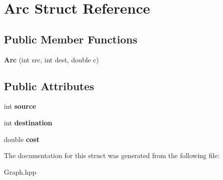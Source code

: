 \hypertarget{structArc}{}\section{Arc Struct Reference}
\label{structArc}
\subsection*{Public Member Functions}
\begin{DoxyCompactItemize}
\item 
{\bfseries Arc} (int src, int dest, double c)\hypertarget{structArc_acdc6a841b8f5ec1ca5661b620bd9c696}{}\label{structArc_acdc6a841b8f5ec1ca5661b620bd9c696}

\end{DoxyCompactItemize}
\subsection*{Public Attributes}
\begin{DoxyCompactItemize}
\item 
int {\bfseries source}\hypertarget{structArc_a45d6a1a415d5eb54a26e51385aaef224}{}\label{structArc_a45d6a1a415d5eb54a26e51385aaef224}

\item 
int {\bfseries destination}\hypertarget{structArc_a0b6a9ac31297f16cb61a13277bec6fd1}{}\label{structArc_a0b6a9ac31297f16cb61a13277bec6fd1}

\item 
double {\bfseries cost}\hypertarget{structArc_ac994f64ab690a24872d032f1509fdca2}{}\label{structArc_ac994f64ab690a24872d032f1509fdca2}

\end{DoxyCompactItemize}


The documentation for this struct was generated from the following file\+:\begin{DoxyCompactItemize}
\item 
Graph.\+hpp\end{DoxyCompactItemize}
